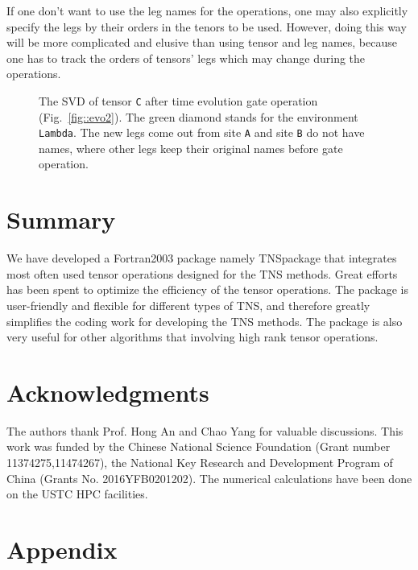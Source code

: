 \documentclass[preprint,3p,times,preprint,showpacs,amsmath,superscriptaddress,floatfix]{elsarticle}
\begin{document}
If one don't want to use the leg names for the operations, one may also explicitly specify the legs by their orders in the tenors
to be used. However, doing this way will be more complicated and elusive than using tensor and leg names,
because one has to track the orders of tensors' legs which may change during the operations.

\begin{figure} [!hbp]
		\begin{center}
		\caption{ The SVD of tensor {\tt C} after time evolution gate operation (Fig.~\ref{fig::evo2}). The green diamond stands for the environment
{\tt Lambda}. The new legs come out from site {\tt A} and site {\tt B} do not have names, where other legs keep their original names before gate operation.
}\label{fig::SVD}
		\end{center}
\end{figure}

\section{Summary}
\label{sec:summary}

We have developed a Fortran2003 package namely TNSpackage that integrates most often used tensor operations
designed for the TNS methods. Great efforts has been spent to optimize the efficiency of the tensor operations.
The package is user-friendly and flexible for different types of TNS, and
therefore greatly simplifies the coding work for developing the TNS methods. The package is also very useful for
other algorithms that involving high rank tensor operations.



\section*{Acknowledgments}
The authors thank Prof. Hong An and Chao Yang for valuable discussions.
This work was funded by the Chinese National Science Foundation (Grant number 11374275,11474267),
the National Key Research and Development Program of China (Grants No. 2016YFB0201202).
The numerical calculations have been done on the USTC HPC facilities.

\section*{Appendix}
\end{document}
